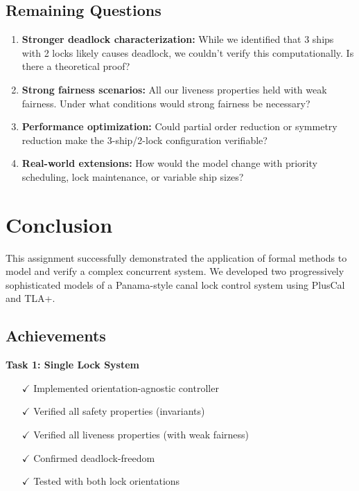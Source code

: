 \documentclass[12pt,a4paper]{article}
\begin{document}
\subsection{Remaining Questions}

\begin{enumerate}
    \item \textbf{Stronger deadlock characterization:} While we identified that 3 ships with 2 locks likely causes deadlock, we couldn't verify this computationally. Is there a theoretical proof?
    
    \item \textbf{Strong fairness scenarios:} All our liveness properties held with weak fairness. Under what conditions would strong fairness be necessary?
    
    \item \textbf{Performance optimization:} Could partial order reduction or symmetry reduction make the 3-ship/2-lock configuration verifiable?
    
    \item \textbf{Real-world extensions:} How would the model change with priority scheduling, lock maintenance, or variable ship sizes?
\end{enumerate}

\newpage
\section{Conclusion}

This assignment successfully demonstrated the application of formal methods to model and verify a complex concurrent system. We developed two progressively sophisticated models of a Panama-style canal lock control system using PlusCal and TLA+.

\subsection{Achievements}

\textbf{Task 1: Single Lock System}
\begin{itemize}
    \item[$\checkmark$] Implemented orientation-agnostic controller
    \item[$\checkmark$] Verified all safety properties (invariants)
    \item[$\checkmark$] Verified all liveness properties (with weak fairness)
    \item[$\checkmark$] Confirmed deadlock-freedom
    \item[$\checkmark$] Tested with both lock orientations
\end{itemize}
\end{document}
